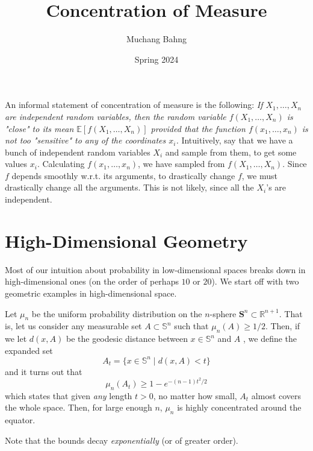\documentclass{article}
\begin{document}
\title{Concentration of Measure}
\author{Muchang Bahng}
\date{Spring 2024}

\maketitle
\tableofcontents
\pagebreak

An informal statement of concentration of measure is the following: \textit{If $X_1, \ldots, X_n$ are independent random variables, then the random variable $f(X_1, \ldots, X_n)$ is "close" to its mean $\mathbb{E}[f(X_1, \ldots, X_n)]$ provided that the function $f(x_1, \ldots, x_n)$ is not too "sensitive" to any of the coordinates $x_i$.} Intuitively, say that we have a bunch of independent random variables $X_i$ and sample from them, to get some values $x_i$. Calculating $f(x_1, \ldots, x_n)$, we have sampled from $f(X_1, \ldots, X_n)$. Since $f$ depends smoothly w.r.t. its arguments, to drastically change $f$, we must drastically change all the arguments. This is not likely, since all the $X_i$'s are independent. 

\section{High-Dimensional Geometry}

Most of our intuition about probability in low-dimensional spaces breaks down in high-dimensional ones (on the order of perhaps $10$ or $20$). We start off with two geometric examples in high-dimensional space. 

\begin{example}
Let $\mu_n$ be the uniform probability distribution on the $n$-sphere $\mathbf{S}^{n} \subset \mathbb{R}^{n+1}$. That is, let us consider any measurable set $A \subset \mathbb{S}^{n}$ such that $\mu_n (A) \geq 1/2$. Then, if we let $d(x, A)$ be the geodesic distance between $x \in \mathbb{S}^n$ and $A$ , we define the expanded set 
\[A_t = \{x \in \mathbb{S}^n \mid d(x, A) < t\}\]
and it turns out that 
\[\mu_n (A_t) \geq 1 - e^{- (n -1) t^2 / 2}\]
which states that given \textit{any} length $t > 0$, no matter how small, $A_t$ almost covers the whole space. Then, for large enough $n$, $\mu_n$ is highly concentrated around the equator. 
\end{example}

Note that the bounds decay \textit{exponentially} (or of greater order). 

\begin{example}

\end{example}
\end{document}
